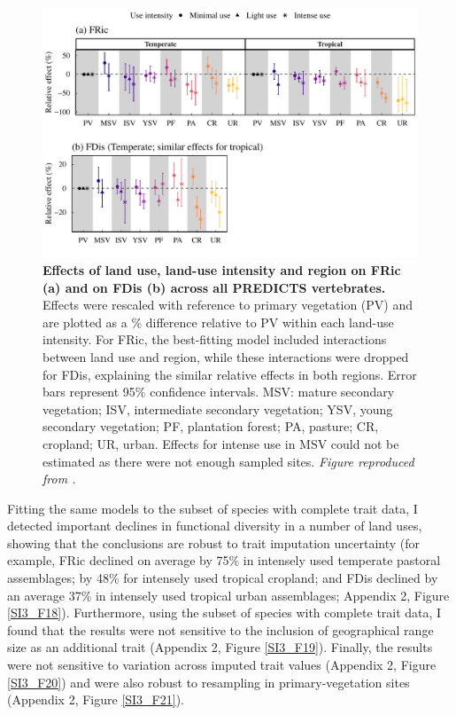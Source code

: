 \begin{figure}[h!]
\centering
\includegraphics[scale=0.75]{figures/Chapter_FD/Figure2}
\caption[Effects of land use, land-use intensity and region on FRic (a) and on FDis (b) across all PREDICTS vertebrates.]{\textbf{ Effects of land use, land-use intensity and region on FRic (a) and on FDis (b) across all PREDICTS vertebrates.} Effects were rescaled with reference to primary vegetation (PV) and are plotted as a \% difference relative to PV within each land-use intensity. For FRic, the best-fitting model included interactions between land use and region, while these interactions were dropped for FDis, explaining the similar relative effects in both regions. Error bars represent 95\% confidence intervals. MSV: mature secondary vegetation; ISV, intermediate secondary vegetation; YSV, young secondary vegetation; PF, plantation forest; PA, pasture; CR, cropland; UR, urban. Effects for intense use in MSV could not be estimated as there were not enough sampled sites. \textit{Figure reproduced from \citet{Etard2021}.}}
\label{chap3_fig2}
\end{figure}

Fitting the same models to the subset of species with complete trait data, I detected important declines in functional diversity in a number of land uses, showing that the conclusions are robust to trait imputation uncertainty (for example, FRic declined on average by 75\% in intensely used temperate pastoral assemblages; by 48\% for intensely used tropical cropland; and FDis declined by an average 37\% in intensely used tropical urban assemblages; Appendix 2, Figure \ref{SI3_F18}). Furthermore, using the subset of species with complete trait data, I found that the results were not sensitive to the inclusion of geographical range size as an additional trait (Appendix 2, Figure \ref{SI3_F19}). Finally, the results were not sensitive to variation across imputed trait values (Appendix 2, Figure \ref{SI3_F20}) and were also robust to resampling in primary-vegetation sites (Appendix 2, Figure \ref{SI3_F21}).

